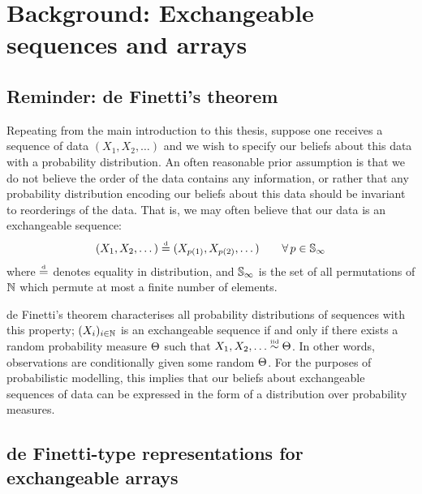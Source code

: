 \section{Background: Exchangeable sequences and arrays}
\label{sec:background}

\subsection{Reminder: de Finetti's theorem}

Repeating from the main introduction to this thesis, suppose one receives a sequence of data $(X_1, X_2, \dots)$ and we wish to specify our beliefs about this data with a probability distribution.
An often reasonable prior assumption is that we do not believe the order of the data contains any information, or rather that any probability distribution encoding our beliefs about this data should be invariant to reorderings of the data.
That is, we may often believe that our data is an exchangeable sequence:
\[
  \label{eq:networks:exch}
  (X_1, X_2, \dots) \stackrel{\mbox{\tiny d}}{=} (X_{p(1)}, X_{p(2)}, \dots) \qquad \forall\, p\in\mathbb{S}_{\infty}
\]
where $\stackrel{\mbox{\tiny d}}{=}$ denotes equality in distribution, and $\mathbb{S}_{\infty}$ is the set of all permutations of $\mathbb{N}$ which permute at most a finite number of elements.

de Finetti's theorem \citep[e.g.][]{Kallenberg2002-il} characterises all probability distributions of sequences with this property;  $(X_i)_{i\in\mathbb{N}}$ is an exchangeable sequence if and only if there exists a random probability measure $\Theta$ such that $X_1,X_2,\ldots\overset{\mbox{\tiny iid}}{\sim}\Theta$.
In other words, observations are conditionally \iid given some random $\Theta$.
For the purposes of probabilistic modelling, this implies that our beliefs about exchangeable sequences of data can be expressed in the form of a distribution over probability measures.

\subsection{de Finetti-type representations for exchangeable arrays}

